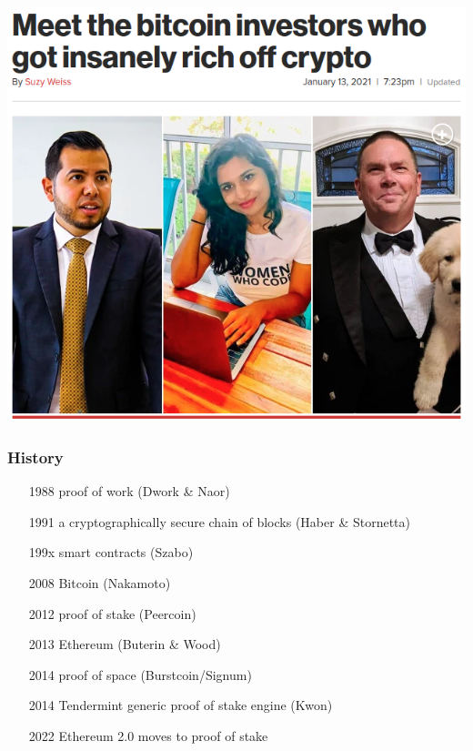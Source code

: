 \documentclass[11pt]{beamer}  %
\begin{document}
\begin{frame}
\begin{center}
    \includegraphics[scale=0.29,clip=false]{pictures/insane.png}
  \end{center}

\end{frame}

\begin{frame}\frametitle{History}

  \begin{itemize}
  \item[1988] proof of work (Dwork \& Naor)
  \item[1991] a cryptographically secure chain of blocks (Haber \& Stornetta)
  \item[199x] smart contracts (Szabo)
  \item[2008] Bitcoin (Nakamoto)
  \item[2012] proof of stake (Peercoin)
  \item[2013] Ethereum (Buterin \& Wood)
  \item[2014] proof of space (Burstcoin/Signum)
  \item[2014] Tendermint generic proof of stake engine (Kwon)
  \item[2022] Ethereum 2.0 moves to proof of stake
  \end{itemize}
  
\end{frame}
\end{document}
